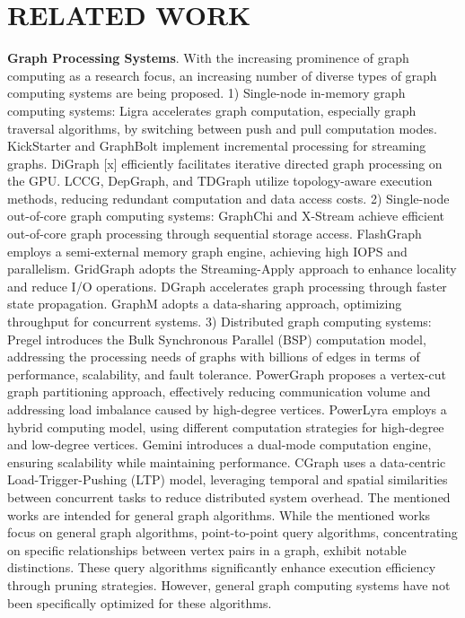 \documentclass[lettersize,journal]{IEEEtran} %
\begin{document}
\section{RELATED WORK}
{\bf{Graph Processing Systems}}. With the increasing prominence of graph computing as a research focus, an increasing number of diverse types of graph computing systems are being proposed. 1) Single-node in-memory graph computing systems: Ligra\cite{ligra} accelerates graph computation, especially graph traversal algorithms, by switching between push and pull computation modes. KickStarter\cite{kickstarter} and GraphBolt\cite{graphbolt} implement incremental processing for streaming graphs. DiGraph [x] efficiently facilitates iterative directed graph processing on the GPU. LCCG\cite{lccg}, DepGraph\cite{depgraph}, and TDGraph\cite{tdgraph} utilize topology-aware execution methods, reducing redundant computation and data access costs. 2) Single-node out-of-core graph computing systems: GraphChi\cite{graphchi} and X-Stream\cite{x-stream} achieve efficient out-of-core graph processing through sequential storage access. FlashGraph\cite{flashgraph} employs a semi-external memory graph engine, achieving high IOPS and parallelism. GridGraph\cite{gridgraph} adopts the Streaming-Apply approach to enhance locality and reduce I/O operations. DGraph\cite{efficient} accelerates graph processing through faster state propagation. GraphM\cite{graphm} adopts a data-sharing approach, optimizing throughput for concurrent systems. 3) Distributed graph computing systems: Pregel\cite{pregel} introduces the Bulk Synchronous Parallel (BSP) computation model, addressing the processing needs of graphs with billions of edges in terms of performance, scalability, and fault tolerance. PowerGraph\cite{powergraph} proposes a vertex-cut graph partitioning approach, effectively reducing communication volume and addressing load imbalance caused by high-degree vertices. PowerLyra\cite{powerlyra} employs a hybrid computing model, using different computation strategies for high-degree and low-degree vertices. Gemini\cite{gemini} introduces a dual-mode computation engine, ensuring scalability while maintaining performance. CGraph\cite{cgraph} uses a data-centric Load-Trigger-Pushing (LTP) model, leveraging temporal and spatial similarities between concurrent tasks to reduce distributed system overhead. The mentioned works are intended for general graph algorithms. While the mentioned works focus on general graph algorithms, point-to-point query algorithms, concentrating on specific relationships between vertex pairs in a graph, exhibit notable distinctions. These query algorithms significantly enhance execution efficiency through pruning strategies. However, 
general graph computing systems have not been specifically optimized for these algorithms.
\end{document}
